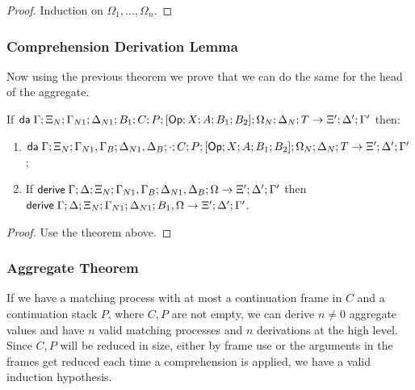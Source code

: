 \begin{proof}
   Induction on $\Omega_1, ..., \Omega_n$.
\end{proof}

\subsubsection{Comprehension Derivation Lemma}

Now using the previous theorem we prove that we can do the same for the head of the aggregate.

\begin{theorem}
   If $\mathsf{da} \; \Gamma; \Xi_N; \Gamma_{N1}; \Delta_{N1}; B_1; C; P; [\mathsf{Op} ; X ; A ; B_1; B_2]; \Omega_N; \Delta_N; T \rightarrow \Xi'; \Delta'; \Gamma'$ then:
   
   \begin{enumerate}
      \item $\mathsf{da} \; \Gamma; \Xi_N; \Gamma_{N1}, \Gamma_B; \Delta_{N1}, \Delta_B; \cdot; C; P; [\mathsf{Op} ; X ; A ; B_1; B_2]; \Omega_N; \Delta_N; T \rightarrow \Xi'; \Delta'; \Gamma'$;
      \item If $\mathsf{derive} \; \Gamma; \Delta; \Xi_N; \Gamma_{N1}, \Gamma_B; \Delta_{N1}, \Delta_B; \Omega \rightarrow \Xi'; \Delta'; \Gamma'$ then $\mathsf{derive} \; \Gamma; \Delta; \Xi_N; \Gamma_{N1}; \Delta_{N1}; B_1, \Omega \rightarrow \Xi'; \Delta'; \Gamma'$.
   \end{enumerate}
\end{theorem}

\begin{proof}
   Use the theorem above.
\end{proof}

\subsubsection{Aggregate Theorem}

If we have a matching process with at most a continuation frame in $C$ and a continuation stack $P$, where $C, P$ are not empty, we can derive $n \neq 0$ aggregate values and have $n$ valid matching processes and $n$ derivations at the high level. Since $C, P$ will be reduced in size, either by frame use or the arguments in the frames get reduced each time a comprehension is applied, we have a valid induction hypothesis.

